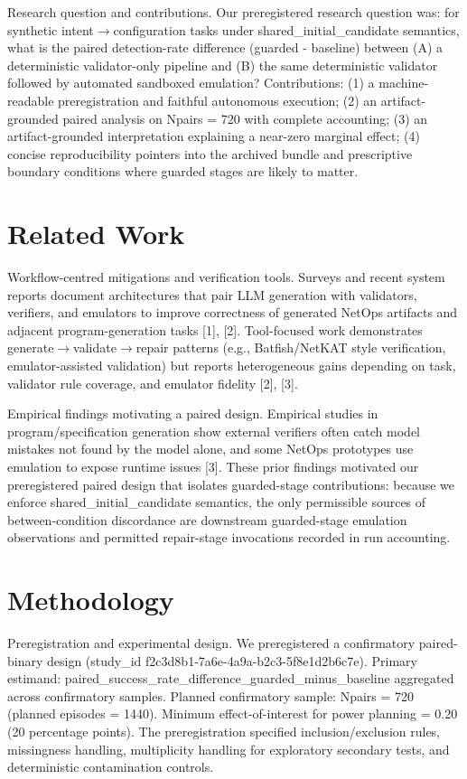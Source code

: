 \documentclass[conference]{IEEEtran}
\begin{document}
Research question and contributions. Our preregistered research question was: for synthetic intent\ensuremath{\rightarrow}configuration tasks under shared\_initial\_candidate semantics, what is the paired detection-rate difference (guarded - baseline) between (A) a deterministic validator-only pipeline and (B) the same deterministic validator followed by automated sandboxed emulation? Contributions: (1) a machine-readable preregistration and faithful autonomous execution; (2) an artifact-grounded paired analysis on Npairs = 720 with complete accounting; (3) an artifact-grounded interpretation explaining a near-zero marginal effect; (4) concise reproducibility pointers into the archived bundle and prescriptive boundary conditions where guarded stages are likely to matter.

\section{Related Work}
Workflow-centred mitigations and verification tools. Surveys and recent system reports document architectures that pair LLM generation with validators, verifiers, and emulators to improve correctness of generated NetOps artifacts and adjacent program-generation tasks [1], [2]. Tool-focused work demonstrates generate\ensuremath{\rightarrow}validate\ensuremath{\rightarrow}repair patterns (e.g., Batfish/NetKAT style verification, emulator-assisted validation) but reports heterogeneous gains depending on task, validator rule coverage, and emulator fidelity [2], [3].

Empirical findings motivating a paired design. Empirical studies in program/specification generation show external verifiers often catch model mistakes not found by the model alone, and some NetOps prototypes use emulation to expose runtime issues [3]. These prior findings motivated our preregistered paired design that isolates guarded-stage contributions: because we enforce shared\_initial\_candidate semantics, the only permissible sources of between-condition discordance are downstream guarded-stage emulation observations and permitted repair-stage invocations recorded in run accounting.

\section{Methodology}
Preregistration and experimental design. We preregistered a confirmatory paired-binary design (study\_id f2c3d8b1-7a6e-4a9a-b2c3-5f8e1d2b6c7e). Primary estimand: paired\_success\_rate\_difference\_guarded\_minus\_baseline aggregated across confirmatory samples. Planned confirmatory sample: Npairs = 720 (planned episodes = 1440). Minimum effect-of-interest for power planning = 0.20 (20 percentage points). The preregistration specified inclusion/exclusion rules, missingness handling, multiplicity handling for exploratory secondary tests, and deterministic contamination controls.
\end{document}
